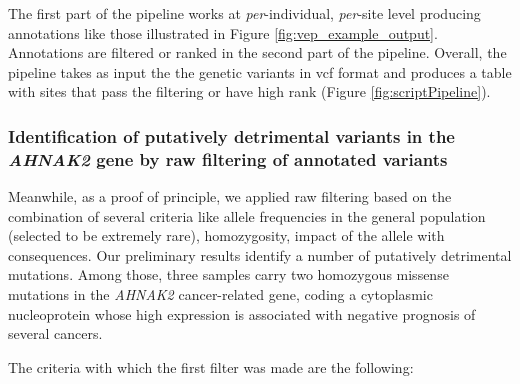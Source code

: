 \documentclass[
tikz,
11pt, %
oneside, %
english, %
singlespacing, %
headsepline, %
]{MastersDoctoralThesisV2} %
\begin{document}
The first part of the pipeline works at \textit{per}-individual, \textit{per}-site level producing annotations like those illustrated in Figure \ref{fig:vep_example_output}. Annotations are filtered or ranked in the second part of the pipeline. Overall, the pipeline takes as input the the genetic variants in vcf format and produces a table with sites that pass the filtering or have high rank (Figure \ref{fig:scriptPipeline}).  






\subsubsection{Identification of putatively detrimental variants in the \textit{AHNAK2} gene by raw filtering of annotated variants}

Meanwhile, as a proof of principle, we applied raw filtering based on the combination of several criteria like allele frequencies in the general population (selected to be extremely rare), homozygosity, impact of the allele with consequences. Our preliminary results identify a number of putatively detrimental mutations. Among those, three samples carry two homozygous missense mutations in the \textit{AHNAK2} cancer-related gene, coding a cytoplasmic nucleoprotein whose high expression is associated with negative prognosis of several cancers\cite{}.



The criteria with which the first filter was made are the following:
\end{document}
